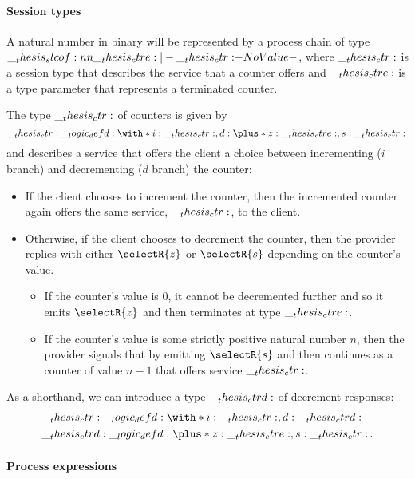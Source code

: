 \paragraph*{Session types}

A natural number in binary will be represented by a process chain of type $\slcof{\ctre |- \ctr}$, where $\__thesis_ctr:$ is a session type that 
describes the service that a counter offers
and $\__thesis_ctre:$ is a type parameter that represents a terminated counter.

The type $\__thesis_ctr:$ of counters is given by
\begin{equation*}
  \ctr \defd \with*{ i: \ctr , d: \plus*{ z: \ctre , s: \ctr } }
  \,
\end{equation*}
and describes a service that offers the client a choice between incrementing ($i$ branch) and decrementing ($d$ branch) the counter:
\begin{itemize}
\item
  If the client chooses to increment the counter, then the incremented counter again offers the same service, $\__thesis_ctr:$, to the client.
\item
  Otherwise, if the client chooses to decrement the counter, then the provider replies with either $\selectR{z}$ or $\selectR{s}$ depending on the counter's value.
  \begin{itemize}
  \item
    If the counter's value is $0$, it cannot be decremented further and so it emits $\selectR{z}$ and then terminates at type $\__thesis_ctre:$.
  \item
    If the counter's value is some strictly positive natural number $n$, then the provider signals that by emitting $\selectR{s}$ and then continues as a counter of value $n-1$ that offers service $\__thesis_ctr:$.
  \end{itemize}
\end{itemize}
As a shorthand, we can introduce a type $\__thesis_ctrd:$ of decrement responses:
\begin{equation*}
  \begin{lgathered}
    \ctr \defd \with*{ i: \ctr , d: \ctrd } \\
    \ctrd \defd \plus*{ z: \ctre , s: \ctr }
    \,.
  \end{lgathered}
\end{equation*}

\paragraph*{Process expressions}

